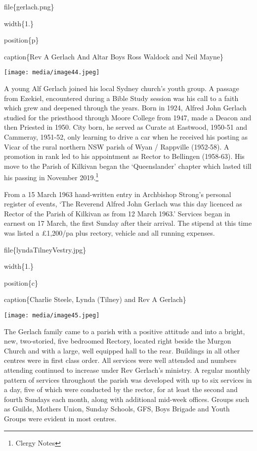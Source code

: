 file\{gerlach.png\}

width\{1.\}

position\{p\}

caption\{Rev A Gerlach And Altar Boys Ross Waldock and Neil Mayne\}

\texttt{[image: media/image44.jpeg]}

A young Alf Gerlach joined his local Sydney church's youth group. A passage from Ezekiel, encountered during a Bible Study session was his call to a faith which grew and deepened through the years. Born in 1924, Alfred John Gerlach studied for the priesthood through Moore College from 1947, made a Deacon and then Priested in 1950. City born, he served as Curate at Eastwood, 1950-51 and Cammeray, 1951-52, only learning to drive a car when he received his posting as Vicar of the rural northern NSW parish of Wyan / Rappville (1952-58). A promotion in rank led to his appointment as Rector to Bellingen (1958-63). His move to the Parish of Kilkivan began the `Queenslander' chapter which lasted till his passing in November 2019.\footnote{Clergy Notes}

From a 15 March 1963 hand-written entry in Archbishop Strong's personal register of events, `The Reverend Alfred John Gerlach was this day licenced as Rector of the Parish of Kilkivan as from 12 March 1963.' Services began in earnest on 17 March, the first Sunday after their arrival. The stipend at this time was listed a £1,200/pa plus rectory, vehicle and all running expenses.

file\{lyndaTilneyVestry.jpg\}

width\{1.\}

position\{c\}

caption\{Charlie Steele, Lynda (Tilney) and Rev A Gerlach\}

\texttt{[image: media/image45.jpeg]}

The Gerlach family came to a parish with a positive attitude and into a bright, new, two-storied, five bedroomed Rectory, located right beside the Murgon Church and with a large, well equipped hall to the rear. Buildings in all other centres were in first class order. All services were well attended and numbers attending continued to increase under Rev Gerlach's ministry. A regular monthly pattern of services throughout the parish was developed with up to six services in a day, five of which were conducted by the rector, for at least the second and fourth Sundays each month, along with additional mid-week offices. Groups such as Guilds, Mothers Union, Sunday Schools, GFS, Boys Brigade and Youth Groups were evident in most centres.

